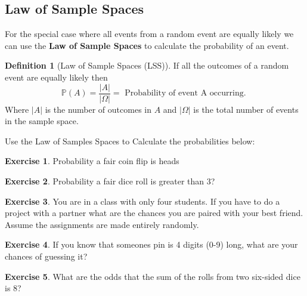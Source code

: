 \documentclass[
]{book}
\newcommand{\prob}[1]{{\mathbb{P}(#1)}}
\theoremstyle{definition}
\newtheorem{definition}{Definition}[chapter]
\theoremstyle{definition}
\theoremstyle{definition}
\newtheorem{exercise}{Exercise}[chapter]
\theoremstyle{definition}
\theoremstyle{remark}
\begin{document}
\hypertarget{law-of-sample-spaces}{%
\subsection{Law of Sample Spaces}\label{law-of-sample-spaces}}

For the special case where all events from a random event are equally likely we can use the \textbf{Law of Sample Spaces} to calculate the probability of an event.

\begin{definition}[Law of Sample Spaces (LSS)]
\protect\hypertarget{def:unnamed-chunk-202}{}\label{def:unnamed-chunk-202}If all the outcomes of a random event are equally likely then \[\prob{A}=\frac{|A|}{|\Omega|}=\text{ Probability of event A occurring. }\] Where \(|A|\) is the number of outcomes in \(A\) and \(|\Omega|\) is the total number of events in the sample space.
\end{definition}

Use the Law of Samples Spaces to Calculate the probabilities below:

\begin{exercise}
\protect\hypertarget{exr:unnamed-chunk-203}{}\label{exr:unnamed-chunk-203}Probability a fair coin flip is heads
\end{exercise}

\begin{exercise}
\protect\hypertarget{exr:unnamed-chunk-204}{}\label{exr:unnamed-chunk-204}Probability a fair dice roll is greater than 3?
\end{exercise}

\begin{exercise}
\protect\hypertarget{exr:unnamed-chunk-205}{}\label{exr:unnamed-chunk-205}You are in a class with only four students. If you have to do a project with a partner what are the chances you are paired with your best friend. Assume the assignments are made entirely randomly.
\end{exercise}

\begin{exercise}
\protect\hypertarget{exr:unnamed-chunk-206}{}\label{exr:unnamed-chunk-206}If you know that someones pin is 4 digits (0-9) long, what are your chances of guessing it?
\end{exercise}

\begin{exercise}
\protect\hypertarget{exr:unnamed-chunk-207}{}\label{exr:unnamed-chunk-207}What are the odds that the sum of the rolls from two six-sided dice is 8?
\end{exercise}
\end{document}
